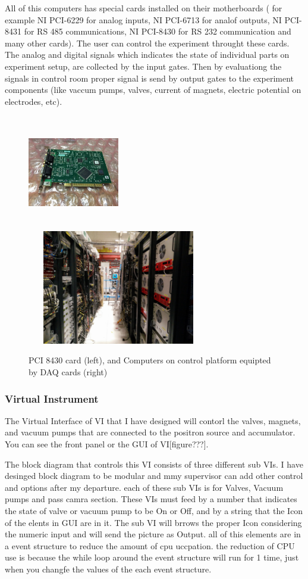 \documentclass{article}
\begin{document}
All of this computers has special cards installed on their motherboards ( for example NI PCI-6229 for analog inputs, NI PCI-6713 for analof outputs, NI PCI-8431 for RS 485 communications, NI PCI-8430 for RS 232 communication and many other cards). The user can control the experiment throught these cards. The analog and digital signals which indicates the state of individual parts on experiment setup, are collected by the input gates. Then by evaluationg the signals in control room proper signal is send by output gates to the experiment components (like vaccum pumps, valves, current of magnets, electric potential on electrodes, etc).

\begin{figure}[h]
\centering
\includegraphics[width=40mm, height=50mm]{PCI_8430}
\includegraphics[width=80mm, height=50mm]{control_platform}
\caption{PCI 8430 card (left), and Computers on control platform equipted by DAQ cards (right) }
\end{figure}
	
\subsubsection{Virtual Instrument}

The Virtual Interface of VI that I have designed will contorl the valves, magnets, and vacuum pumps that are connected to the positron source and accumulator. You can see the front panel or the GUI of VI[figure???]. 

The block diagram that controls this VI consists of three different sub VIs. I have desinged  block diagram to be modular and mmy supervisor can add other control and options after my departure. each of these sub VIs is for Valves, Vacuum pumps and pass camra section. These VIs must feed by a number that indicates the state of valve or vacuum pump to be On or Off, and by a string that the Icon of the elents in GUI are in it. The sub VI will brrows the proper Icon considering the numeric input and will send the picture as Output. all of this elements are in a event structure to reduce the amount of cpu uccpation. the reduction of CPU use is because the while loop around the event structure will run for 1 time, just when you changfe the values of the each event structure.
\end{document}
